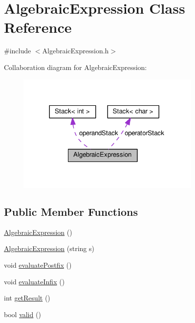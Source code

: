 \hypertarget{classAlgebraicExpression}{}\section{Algebraic\+Expression Class Reference}
\label{classAlgebraicExpression}


{\ttfamily \#include $<$Algebraic\+Expression.\+h$>$}



Collaboration diagram for Algebraic\+Expression\+:
\nopagebreak
\begin{figure}[H]
\begin{center}
\leavevmode
\includegraphics[width=257pt]{classAlgebraicExpression__coll__graph}
\end{center}
\end{figure}
\subsection*{Public Member Functions}
\begin{DoxyCompactItemize}
\item 
\hyperlink{classAlgebraicExpression_ae80b781e8b44002cdadf57fd4f092a8d}{Algebraic\+Expression} ()
\item 
\hyperlink{classAlgebraicExpression_aabfd3685b5e424afcf6fd0766820f953}{Algebraic\+Expression} (string s)
\item 
void \hyperlink{classAlgebraicExpression_ac0428ac1f1072f14e1391527baebd330}{evaluate\+Postfix} ()
\item 
void \hyperlink{classAlgebraicExpression_a0aeff15e3d0d529bd20a59f8d312a38d}{evaluate\+Infix} ()
\item 
int \hyperlink{classAlgebraicExpression_afcf555b573e6083a8395677bf056aef1}{get\+Result} ()
\item 
bool \hyperlink{classAlgebraicExpression_aa3c08af8a2b4d67c356f3cf69b2f6bc6}{valid} ()
\end{DoxyCompactItemize}

